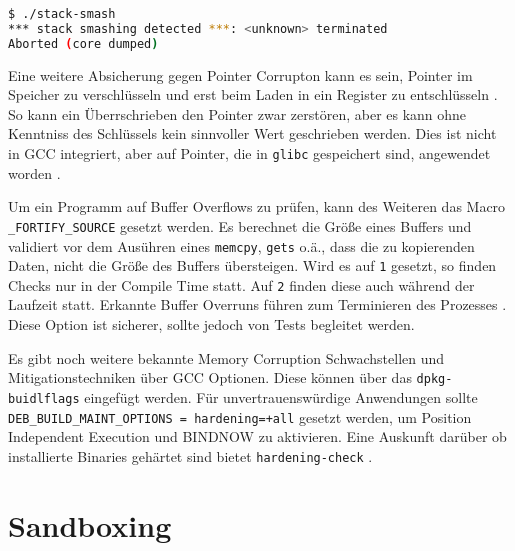\begin{lstlisting}[language=bash]
$ ./stack-smash
*** stack smashing detected ***: <unknown> terminated
Aborted (core dumped)
\end{lstlisting}

Eine weitere Absicherung gegen Pointer Corrupton kann es sein, Pointer im Speicher zu verschlüsseln und erst beim Laden in ein Register zu entschlüsseln \cite{pointguard}. So kann ein Überrschrieben den Pointer zwar zerstören, aber es kann ohne Kenntniss des Schlüssels kein sinnvoller Wert geschrieben werden. Dies ist nicht in GCC integriert, aber auf Pointer, die in \texttt{glibc} gespeichert sind, angewendet worden \cite{ubuntu-security}.

Um ein Programm auf Buffer Overflows zu prüfen, kann des Weiteren das Macro \texttt{\_FORTIFY\_SOURCE} gesetzt werden. Es berechnet die Größe eines Buffers und validiert vor dem Ausühren eines \texttt{memcpy}, \texttt{gets} o.ä., dass die zu kopierenden Daten, nicht die Größe des Buffers übersteigen.
Wird es auf \texttt{1} gesetzt, so finden Checks nur in der Compile Time statt. Auf \texttt{2} finden diese auch während der Laufzeit statt. Erkannte Buffer Overruns führen zum Terminieren des Prozesses \cite{man-fortify}. Diese Option ist sicherer, sollte jedoch von Tests begleitet werden. 



Es gibt noch weitere bekannte Memory Corruption Schwachstellen und Mitigationstechniken über GCC Optionen. Diese können über das \texttt{dpkg-buidlflags} eingefügt werden. Für unvertrauenswürdige Anwendungen sollte \texttt{DEB\_BUILD\_MAINT\_OPTIONS = hardening=+all} gesetzt werden, um Position Independent Execution und BINDNOW zu aktivieren. Eine Auskunft darüber ob installierte Binaries gehärtet sind bietet \texttt{hardening-check} \cite{debian-hardening}. 



\section{Sandboxing}

